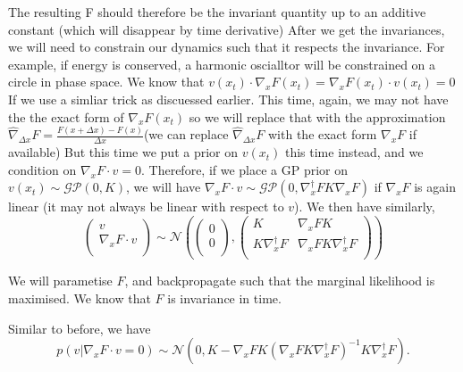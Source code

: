 \documentclass{article}
\begin{document}
The resulting F should therefore be the invariant quantity up to an additive constant (which will disappear by time derivative)
After we get the invariances, we will need to constrain our dynamics such that it respects the invariance. 
For example, if energy is conserved, a harmonic oscialltor will be constrained on a circle in phase space.
We know that $v(x_t)\cdot\nabla_x F(x_t)=\nabla_x F(x_t) \cdot v(x_t) = 0$
If we use a simliar trick as discuessed earlier.
This time, again, we may not have the the exact form of $\nabla_x F(x_t)$ so we will replace that with the approximation $\hat{\nabla}_{\Delta x}F=\frac{F(x+\Delta x)-F(x)}{\Delta x}$(we can replace $\hat{\nabla}_{\Delta x}F$ with the exact form $\nabla_xF$ if available)
But this time we put a prior on $v(x_t)$ this time instead, and we condition on $\nabla_xF \cdot v=0$.
Therefore, if we place a GP prior on $v(x_t)\sim\mathcal{GP}(0, K)$, we will have $\nabla_xF \cdot v \sim \mathcal{GP}(0, \nabla^\dagger_xF K \nabla_xF)$ if $\nabla_xF$ is again linear (it may not always be linear with respect to $v$). 
We then have similarly, 
\begin{equation*}
  \begin{pmatrix}
    v\\
    \nabla_xF\cdot v\\
  \end{pmatrix}
  \sim
  \mathcal{N}
  \left(
  \begin{pmatrix}
      0\\
      0\\
  \end{pmatrix}
  ,
  \begin{pmatrix}
    K & \nabla_xF K \\
    K\nabla^\dagger_xF & \nabla_xF K \nabla_x^\dagger F\\
  \end{pmatrix}
  \right)
\end{equation*}

We will parametise $F$, and backpropagate such that the marginal likelihood is maximised. 
We know that $F$ is invariance in time.


Similar to before, we have 
$$
p(v|\nabla_xF\cdot v=0)\sim \mathcal{N}\left(0,K-\nabla_xFK(\nabla_xF K \nabla_x^\dagger F)^{-1}K\nabla_x^\dagger F\right).
$$
\end{document}
